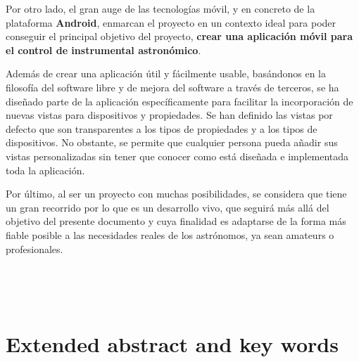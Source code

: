 {\bigskip
Por otro lado, el gran auge de las tecnologías móvil, y en concreto de la plataforma \textbf{Android}, enmarcan el proyecto en un contexto ideal para poder conseguir el principal objetivo del proyecto, \textbf{crear una aplicación móvil para el control de instrumental astronómico}.

\bigskip
Además de crear una aplicación útil y fácilmente usable, basándonos en la filosofía del software libre y de mejora del software a través de terceros, se ha diseñado parte de la aplicación específicamente para facilitar la incorporación de nuevas vistas para dispositivos y propiedades. Se han definido las vistas por defecto que son transparentes a los tipos de propiedades y a los tipos de dispositivos. No obstante, se permite que cualquier persona pueda añadir sus vistas personalizadas sin tener que conocer como está diseñada e implementada toda la aplicación.

\bigskip
Por último, al ser un proyecto con muchas posibilidades, se considera que tiene un gran recorrido por lo que es un desarrollo vivo, que seguirá más allá del objetivo del presente documento y cuya finalidad es adaptarse de la forma más fiable posible a las necesidades reales de los astrónomos, ya sean amateurs o profesionales.

\newpage
\begin{center}
{\LARGE\bfseries\tituloEng}\\
\end{center}
\begin{center}
\autor\
\end{center}

\section{Extended abstract and key words}

}
